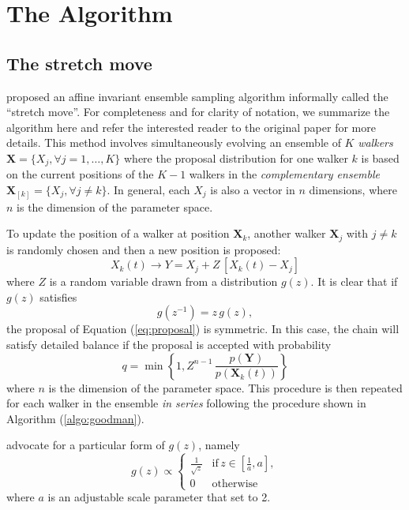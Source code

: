 \documentclass[12pt,preprint]{aastex}
\newcommand{\eq}[1]{Equation (\ref{eq:#1})}
\newcommand{\eqlabel}[1]{\label{eq:#1}}
\newcommand{\algo}[1]{Algorithm (\ref{algo:#1})}
\begin{document}
\section{The Algorithm}

\subsection{The stretch move}

\citet{Goodman:2010} proposed an affine invariant ensemble sampling algorithm
informally called the ``stretch move''. For completeness and for clarity of
notation, we summarize the algorithm here and refer the interested reader to
the original paper for more details. This method involves simultaneously
evolving an ensemble of $K$ \emph{walkers}
$\mathbf{X} = \{ X_j, \forall j=1,\ldots,K \}$ where the proposal
distribution for one walker $k$ is based on the current positions of the
$K-1$ walkers in the \emph{complementary ensemble}
$\mathbf{X}_{[k]} = \{ X_j, \forall j \ne k \}$. In general, each $X_j$ is
also a vector in $n$ dimensions, where $n$ is the dimension of the parameter
space.

To update the position of a walker at position $\mathbf{X}_k$,
another walker $\mathbf{X}_j$ with $j \ne k$ is randomly chosen and then
a new position is proposed:
\begin{equation}
    \eqlabel{proposal}
    {X}_k (t) \to {Y} = {X}_j + Z \, [{X}_k (t) - {X}_j]
\end{equation}
where $Z$ is a random variable drawn from a distribution $g(z)$.  It is clear
that if $g(z)$ satisfies
\begin{equation}
    g(z^{-1}) = z \, g(z),
\end{equation}
the proposal of \eq{proposal} is symmetric. In this case, the chain will
satisfy detailed balance if the proposal is accepted with probability
\begin{equation}
    \eqlabel{acceptance}
    q = \min \left \{ 1, Z^{n-1} \,
                \frac{p(\mathbf{Y})}{p(\mathbf{X}_k(t))} \right \}
\end{equation}
where $n$ is the dimension of the parameter space. This procedure is then
repeated for each walker in the ensemble \emph{in series} following the
procedure shown in \algo{goodman}.

\citet{Goodman:2010} advocate for a particular form of $g(z)$, namely
\begin{equation}
    \eqlabel{goodmanprop}
    g(z) \propto \left \{ \begin{array}{ll}
        \displaystyle\frac{1}{\sqrt{z}} & \mathrm{if}\, z\in
                        \left [ \displaystyle\frac{1}{a}, a \right ], \\
        0 & \mathrm{otherwise}
    \end{array} \right .
\end{equation}
where $a$ is an adjustable scale parameter that \citet{Goodman:2010} set
to 2.
\end{document}
